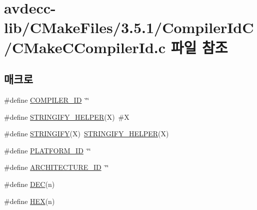 \hypertarget{avdecc-lib_2_c_make_files_23_85_81_2_compiler_id_c_2_c_make_c_compiler_id_8c}{}\section{avdecc-\/lib/\+C\+Make\+Files/3.5.1/\+Compiler\+Id\+C/\+C\+Make\+C\+Compiler\+Id.c 파일 참조}
\label{avdecc-lib_2_c_make_files_23_85_81_2_compiler_id_c_2_c_make_c_compiler_id_8c}
\subsection*{매크로}
\begin{DoxyCompactItemize}
\item 
\#define \hyperlink{avdecc-lib_2_c_make_files_23_85_81_2_compiler_id_c_2_c_make_c_compiler_id_8c_a81dee0709ded976b2e0319239f72d174}{C\+O\+M\+P\+I\+L\+E\+R\+\_\+\+ID}~\char`\"{}\char`\"{}
\item 
\#define \hyperlink{avdecc-lib_2_c_make_files_23_85_81_2_compiler_id_c_2_c_make_c_compiler_id_8c_a2ae9b72bb13abaabfcf2ee0ba7d3fa1d}{S\+T\+R\+I\+N\+G\+I\+F\+Y\+\_\+\+H\+E\+L\+P\+ER}(X)~\#X
\item 
\#define \hyperlink{avdecc-lib_2_c_make_files_23_85_81_2_compiler_id_c_2_c_make_c_compiler_id_8c_a43e1cad902b6477bec893cb6430bd6c8}{S\+T\+R\+I\+N\+G\+I\+FY}(X)~\hyperlink{lib_2avtp__pipeline_2build__avdecc_2_c_make_files_23_85_81_2_compiler_id_c_x_x_2_c_make_c_x_x_compiler_id_8cpp_a2ae9b72bb13abaabfcf2ee0ba7d3fa1d}{S\+T\+R\+I\+N\+G\+I\+F\+Y\+\_\+\+H\+E\+L\+P\+ER}(X)
\item 
\#define \hyperlink{avdecc-lib_2_c_make_files_23_85_81_2_compiler_id_c_2_c_make_c_compiler_id_8c_adbc5372f40838899018fadbc89bd588b}{P\+L\+A\+T\+F\+O\+R\+M\+\_\+\+ID}~\char`\"{}\char`\"{}
\item 
\#define \hyperlink{avdecc-lib_2_c_make_files_23_85_81_2_compiler_id_c_2_c_make_c_compiler_id_8c_aba35d0d200deaeb06aee95ca297acb28}{A\+R\+C\+H\+I\+T\+E\+C\+T\+U\+R\+E\+\_\+\+ID}~\char`\"{}\char`\"{}
\item 
\#define \hyperlink{avdecc-lib_2_c_make_files_23_85_81_2_compiler_id_c_2_c_make_c_compiler_id_8c_ad1280362da42492bbc11aa78cbf776ad}{D\+EC}(n)
\item 
\#define \hyperlink{avdecc-lib_2_c_make_files_23_85_81_2_compiler_id_c_2_c_make_c_compiler_id_8c_a46d5d95daa1bef867bd0179594310ed5}{H\+EX}(n)
\end{DoxyCompactItemize}
